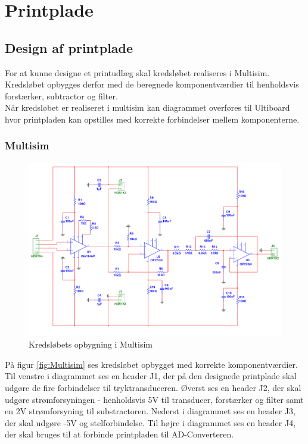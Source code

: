 \section{Printplade}
\subsection{Design af printplade}
\vspace{0.5 cm}
For at kunne designe et printudlæg skal kredsløbet realiseres i Multisim. Kredsløbet opbygges derfor med de beregnede komponentværdier til henholdsvis forstærker, subtractor og filter. \\
Når kredsløbet er realiseret i multisim kan diagrammet overføres til Ultiboard hvor printpladen kan opstilles med korrekte forbindelser mellem komponenterne.
\subsubsection{Multisim}
\begin{figure}[h!]
	\centering
	\includegraphics[width=1\linewidth]{Hardware/Multisim}
	\caption{Kredsløbets opbygning i Multisim}
	\label{fig:Multisim}
\end{figure}

På figur \vref{fig:Multisim} ses kredsløbet opbygget med korrekte komponentværdier. Til venstre i diagrammet ses en header J1, der på den designede printplade skal udgøre de fire forbindelser til tryktransduceren. Øverst ses en header J2, der skal udgøre strømforsyningen - henholdsvis 5V til transducer, forstærker og filter samt en 2V strømforsyning til substractoren. Nederst i diagrammet ses en header J3, der skal udgøre -5V og stelforbindelse. Til højre i diagrammet ses en header J4, der skal bruges til at forbinde printpladen til AD-Converteren.


